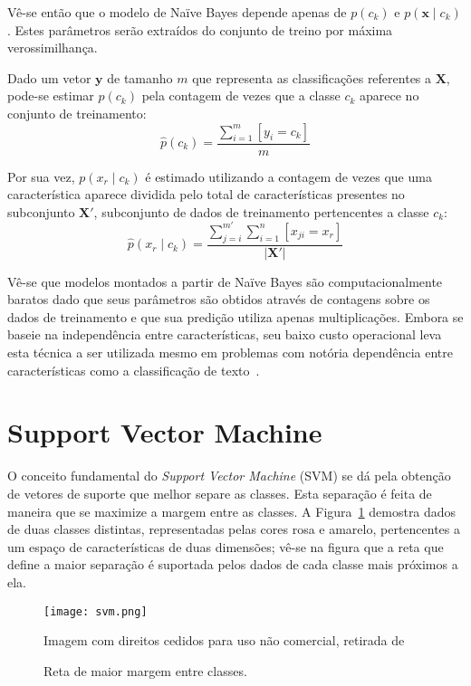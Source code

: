 Vê-se então que o modelo de Naïve Bayes depende apenas de $p(c_k)$ e $p(\mathbf{x} \mid c_k)$.
Estes parâmetros serão extraídos do conjunto de treino por máxima verossimilhança.

Dado um vetor $\mathbf{y}$ de tamanho $m$ que representa as classificações referentes a $\mathbf{X}$, pode-se estimar
$p(c_k)$ pela contagem de vezes que a classe $c_k$ aparece no conjunto de treinamento:
\begin{equation}
    \hat{p}(c_k) = \frac{\sum_{i=1}^m [y_i = c_k]}{m}
\end{equation}

Por sua vez, $p(x_r \mid c_k)$ é estimado utilizando a contagem de vezes que uma característica aparece dividida pelo
total de características presentes no subconjunto $\mathbf{X'}$, subconjunto de dados de treinamento pertencentes a
classe $c_k$:
\begin{equation}
    \hat{p}(x_r \mid c_k) = \frac{\sum_{j=i}^{m'} \sum_{i=1}^n [x_{ji} = x_r]}{|\mathbf{X'}|}
\end{equation}

Vê-se que modelos montados a partir de Naïve Bayes são computacionalmente baratos dado que seus parâmetros são
obtidos através de contagens sobre os dados de treinamento e que sua predição utiliza apenas multiplicações.
Embora se baseie na independência entre características, seu baixo custo operacional leva esta técnica a ser utilizada
mesmo em problemas com notória dependência entre características como a classificação de texto~\cite{mccallum98}.

\section{Support Vector Machine}

O conceito fundamental do \textit{Support Vector Machine} (SVM) se dá pela obtenção de vetores de suporte que melhor
separe as classes.
Esta separação é feita de maneira que se maximize a margem entre as classes.
A Figura~\ref{fig:svm} demostra dados de duas classes distintas, representadas pelas cores rosa e amarelo, pertencentes
a um espaço de características de duas dimensões; vê-se na figura que a reta que define a maior separação é suportada
pelos dados de cada classe mais próximos a ela.

\begin{figure}
\begin{center} {
    \begin{center}
    \texttt{[image: svm.png]}
    \caption{Reta de maior margem entre classes.}
    \small Imagem com direitos cedidos para uso não comercial, retirada de~\cite{vanderplas15}
    \label{fig:svm}
    \end{center}
}
\end{center}
\end{figure}


